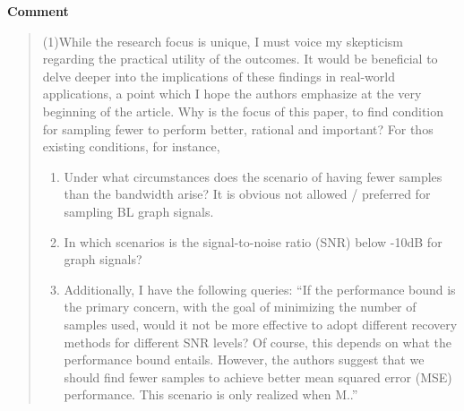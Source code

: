 \documentclass[11pt,onecolumn,journal]{IEEEtran}
\theoremstyle{definition}
\begin{document}
\textbf{Comment}
\begin{quote}
(1)While the research focus is unique, I must voice my skepticism regarding the practical utility of the outcomes. It would be beneficial to delve deeper into the implications of these findings in real-world applications, a point which I hope the authors emphasize at the very beginning of the article. Why is the focus of this paper, to find condition for sampling fewer to perform better, rational and important? For thos existing conditions, for instance, 
\begin{enumerate}
    \item Under what circumstances does the scenario of having fewer samples than the bandwidth arise? It is obvious not allowed / preferred for sampling BL graph signals. 
    \item In which scenarios is the signal-to-noise ratio (SNR) below -10dB for graph signals?
    \item Additionally, I have the following queries: 
``If the performance bound is the primary concern, with the goal of minimizing the number of samples used, would it not be more effective to adopt different recovery methods for different SNR levels? Of course, this depends on what the performance bound entails. However, the authors suggest that we should find fewer samples to achieve better mean squared error (MSE) performance. This scenario is only realized when M..''
\end{enumerate}
\end{quote}
\end{document}
